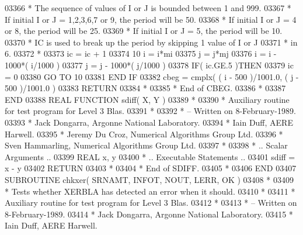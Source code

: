 \begin{DoxyCode}
03366 \textcolor{comment}{*     The sequence of values of I or J is bounded between 1 and 999.}
03367 \textcolor{comment}{*     If initial I or J = 1,2,3,6,7 or 9, the period will be 50.}
03368 \textcolor{comment}{*     If initial I or J = 4 or 8, the period will be 25.}
03369 \textcolor{comment}{*     If initial I or J = 5, the period will be 10.}
03370 \textcolor{comment}{*     IC is used to break up the period by skipping 1 value of I or J}
03371 \textcolor{comment}{*     in 6.}
03372 \textcolor{comment}{*}
03373       ic = ic + 1
03374    10 i = i*mi
03375       j = j*mj
03376       i = i - 1000*( i/1000 )
03377       j = j - 1000*( j/1000 )
03378       \textcolor{keywordflow}{IF}( ic.GE.5 )\textcolor{keywordflow}{THEN}
03379          ic = 0
03380          \textcolor{keywordflow}{GO TO} 10
03381 \textcolor{keywordflow}{      END IF}
03382       cbeg = cmplx( ( i - 500 )/1001.0, ( j - 500 )/1001.0 )
03383       \textcolor{keywordflow}{RETURN}
03384 \textcolor{comment}{*}
03385 \textcolor{comment}{*     End of CBEG.}
03386 \textcolor{comment}{*}
03387 \textcolor{keyword}{      END}
03388 \textcolor{keyword}{      REAL }\textcolor{keyword}{FUNCTION }sdiff( X, Y )
03389 \textcolor{comment}{*}
03390 \textcolor{comment}{*  Auxiliary routine for test program for Level 3 Blas.}
03391 \textcolor{comment}{*}
03392 \textcolor{comment}{*  -- Written on 8-February-1989.}
03393 \textcolor{comment}{*     Jack Dongarra, Argonne National Laboratory.}
03394 \textcolor{comment}{*     Iain Duff, AERE Harwell.}
03395 \textcolor{comment}{*     Jeremy Du Croz, Numerical Algorithms Group Ltd.}
03396 \textcolor{comment}{*     Sven Hammarling, Numerical Algorithms Group Ltd.}
03397 \textcolor{comment}{*}
03398 \textcolor{comment}{*     .. Scalar Arguments ..}
03399       \textcolor{keywordtype}{REAL}               x, y
03400 \textcolor{comment}{*     .. Executable Statements ..}
03401       sdiff = x - y
03402       \textcolor{keywordflow}{RETURN}
03403 \textcolor{comment}{*}
03404 \textcolor{comment}{*     End of SDIFF.}
03405 \textcolor{comment}{*}
03406 \textcolor{keyword}{      END}
03407 \textcolor{keyword}{      SUBROUTINE }chkxer( SRNAMT, INFOT, NOUT, LERR, OK )
03408 \textcolor{comment}{*}
03409 \textcolor{comment}{*  Tests whether XERBLA has detected an error when it should.}
03410 \textcolor{comment}{*}
03411 \textcolor{comment}{*  Auxiliary routine for test program for Level 3 Blas.}
03412 \textcolor{comment}{*}
03413 \textcolor{comment}{*  -- Written on 8-February-1989.}
03414 \textcolor{comment}{*     Jack Dongarra, Argonne National Laboratory.}
03415 \textcolor{comment}{*     Iain Duff, AERE Harwell.}

\end{DoxyCode}
